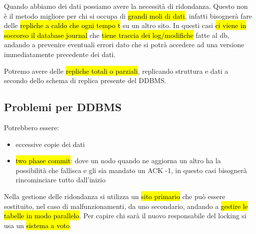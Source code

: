 Quando abbiamo dei dati possiamo avere la necessità di ridondanza. Questo non è il metodo migliore per chi si occupa di \hl{grandi moli di dati}, infatti bisognerà fare delle \hl{repliche a caldo che ogni tempo t} su un altro sito. In questi casi \hl{ci viene in soccorso il database journal} che \hl{tiene traccia dei log/modifiche} fatte al db, andando a prevenire eventuali errori dato che si potrà accedere ad una versione immediatamente precedente dei dati.

Potremo avere delle \hl{repliche totali o parziali}, replicando struttura e dati a secondo dello schema di replica presente del DDBMS.


\subsection{Problemi per DDBMS}

Potrebbero essere:

\begin{itemize}
    \item eccessive copie dei dati
    \item \hl{two phase commit}: dove un nodo quando ne aggiorna un altro ha la possibilità che fallisca e gli sia mandato un ACK -1, in questo casi bisognerà rincominciare tutto dall'inizio
\end{itemize}

Nella gestione delle ridondanza si utilizza un \hl{sito primario} che può essere sostituito, nel caso di malfunzionamenti, da uno secondario, andando a \hl{gestire le tabelle in modo parallelo}. Per capire chi sarà il nuovo responsabile del locking si usa un \hl{sistema a voto}.